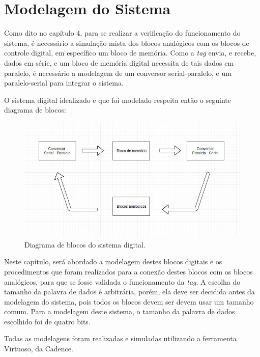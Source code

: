 
\chapter{Modelagem do Sistema}

Como dito no capítulo 4, para se realizar a verificação do funcionamento do sistema, é necessário a simulação mista dos blocos analógicos com os blocos de controle digital, em específico um bloco de memória. Como a \textit{tag} envia, e recebe, dados em série, e um bloco de memória digital necessita de tais dados em paralelo, é necessário a modelagem de um conversor serial-paralelo, e um paralelo-serial para integrar o sistema.

O sistema digital idealizado e que foi modelado respeita então o seguinte diagrama de blocos:

\begin{figure}[ht!]
  \centering
  \includegraphics[width=\textwidth]{figuras/blocosmodelagem.JPG}
  \caption{Diagrama de blocos do sistema digital.}
  \label{bmodelagem}
\end{figure}

Neste capítulo, será abordado a modelagem destes blocos digitais e os procedimentos que foram realizados para a conexão destes blocos com os blocos analógicos, para que se fosse validada o funcionamento da
\textit{tag}. A escolha do tamanho da palavra de dados é arbitrária, porém, ela deve ser decidida antes da modelagem do sistema, pois todos os blocos devem ser devem usar um tamanho comum. Para a modelagem deste sistema, o tamanho da palavra de dados escolhido foi de quatro bits.

Todas as modelagens foram realizadas e simuladas utilizando a ferramenta Virtuoso, da Cadence.

